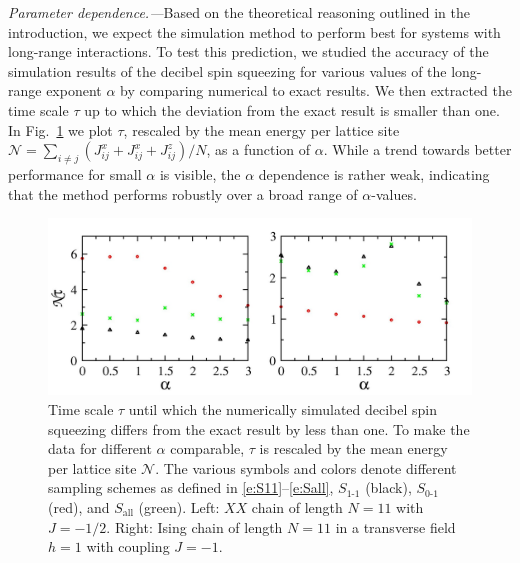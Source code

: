 \documentclass[aps,prl,showpacs,amsmath,amssymb,superscriptaddress,reprint,10pt]{revtex4-1}
\begin{document}
{\em Parameter dependence.---}Based on the theoretical reasoning outlined in the introduction, we expect the simulation method to perform best for systems with long-range interactions. To test this prediction, we studied the accuracy of the simulation results of the decibel spin squeezing for various values of the long-range exponent $\alpha$ by comparing numerical to exact results. We then extracted the time scale $\tau$ up to which the deviation from the exact result is smaller than one. In Fig.~\ref{f:alpha_dependence} we plot $\tau$, rescaled by the mean energy per lattice site $\mathscr{N}=\sum_{i\neq j} (J_{ij}^x+J_{ij}^x+J_{ij}^z)/N$, as a function of $\alpha$. While a trend towards better performance for small $\alpha$ is visible, the $\alpha$ dependence is rather weak, indicating that the method performs robustly over a broad range of $\alpha$-values. 

\begin{figure}\centering
\includegraphics[width=\linewidth]{./Compare_XY_tau_alpha_N11_dtwa2o_ED_rescaled.jpg}
\caption{\label{f:alpha_dependence}%
Time scale $\tau$ until which the numerically simulated decibel spin squeezing differs from the exact result by less than one. To make the data for different $\alpha$ comparable, $\tau$ is rescaled by the mean energy per lattice site $\mathscr{N}$. The various symbols and colors denote different sampling schemes as defined in \eqref{e:S11}--\eqref{e:Sall}, $S_{\text{1-1}}$ (black), $S_{\text{0-1}}$ (red), and $S_{\text{all}}$ (green). Left: $XX$ chain of length $N=11$ with $J=-1/2$. Right: Ising chain of length $N=11$ in a transverse field $h=1$ with coupling $J=-1$.
}%
\end{figure}
\end{document}
